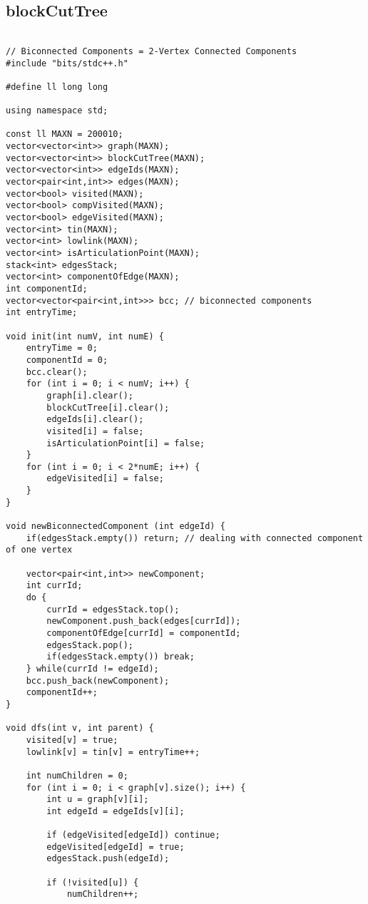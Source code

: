 \documentclass[landscape,twocolumn,10pt,a4paper]{article}
\begin{document}
\subsection{blockCutTree}
\begin{verbatim}

// Biconnected Components = 2-Vertex Connected Components
#include "bits/stdc++.h"

#define ll long long

using namespace std;

const ll MAXN = 200010;
vector<vector<int>> graph(MAXN);
vector<vector<int>> blockCutTree(MAXN);
vector<vector<int>> edgeIds(MAXN);
vector<pair<int,int>> edges(MAXN);
vector<bool> visited(MAXN);
vector<bool> compVisited(MAXN);
vector<bool> edgeVisited(MAXN);
vector<int> tin(MAXN);
vector<int> lowlink(MAXN);
vector<int> isArticulationPoint(MAXN);
stack<int> edgesStack;
vector<int> componentOfEdge(MAXN);
int componentId;
vector<vector<pair<int,int>>> bcc; // biconnected components
int entryTime;

void init(int numV, int numE) {
    entryTime = 0;
    componentId = 0;
    bcc.clear();
    for (int i = 0; i < numV; i++) {
        graph[i].clear();
        blockCutTree[i].clear();
        edgeIds[i].clear();
        visited[i] = false;
        isArticulationPoint[i] = false;
    }
    for (int i = 0; i < 2*numE; i++) {
        edgeVisited[i] = false;
    }
}

void newBiconnectedComponent (int edgeId) {
    if(edgesStack.empty()) return; // dealing with connected component of one vertex
    
    vector<pair<int,int>> newComponent;
    int currId;
    do {
        currId = edgesStack.top();
        newComponent.push_back(edges[currId]);
        componentOfEdge[currId] = componentId;
        edgesStack.pop();
        if(edgesStack.empty()) break;
    } while(currId != edgeId);
    bcc.push_back(newComponent);
    componentId++;
}

void dfs(int v, int parent) {
    visited[v] = true;
    lowlink[v] = tin[v] = entryTime++;

    int numChildren = 0;
    for (int i = 0; i < graph[v].size(); i++) {
        int u = graph[v][i];
        int edgeId = edgeIds[v][i];

        if (edgeVisited[edgeId]) continue;
        edgeVisited[edgeId] = true;
        edgesStack.push(edgeId);

        if (!visited[u]) {
            numChildren++;


\end{verbatim}
\end{document}
